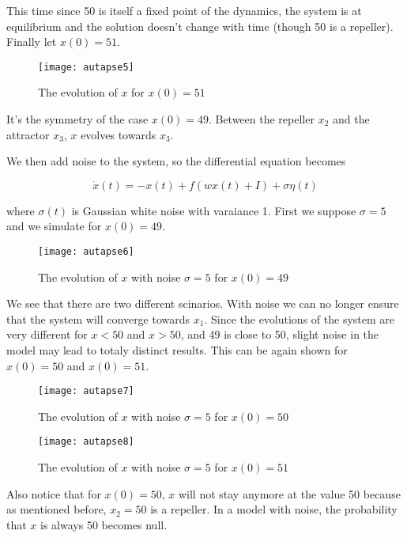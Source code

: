 \noindent
This time since 50 is itself a fixed point of the dynamics, the system 
is at equilibrium and the solution doesn't change with time (though 50
is a repeller). Finally let $x(0) = 51$.

\vspace{-1em}
\begin{figure}[H]
  \centering
  \texttt{[image: autapse5]}
  \caption{The evolution of $x$ for $x(0) = 51$}
\end{figure}

\noindent
It's the symmetry of the case $x(0) = 49$. Between the repeller $x_2$ and
the attractor $x_3$, $x$ evolves towards $x_3$.

We then add noise to the system, so the differential equation becomes

\[\dot{x}(t) = -x(t) + f(wx(t)+I) + \sigma\eta(t)\]

\noindent
where $\sigma(t)$ is Gaussian white noise with varaiance 1. First we suppose 
$\sigma = 5$ and we simulate for $x(0) = 49$.

\vspace{-1em}
\begin{figure}[H]
  \centering
  \texttt{[image: autapse6]}
  \caption{The evolution of $x$ with noise $\sigma = 5$ for $x(0) = 49$}
\end{figure}

We see that there are two different scinarios. With noise we can no longer
ensure that the system will converge towards $x_1$. Since the evolutions of
the system are very different for $x < 50$ and $x > 50$, and 49 is close
to 50, slight noise in the model may lead to totaly distinct results. This can
be again shown for $x(0) = 50$ and $x(0) = 51$.

\vspace{-1em}
\begin{figure}[H]
  \centering
  \texttt{[image: autapse7]}
  \caption{The evolution of $x$ with noise $\sigma = 5$ for $x(0) = 50$}
\end{figure}

\vspace{-1em}
\begin{figure}[H]
  \centering
  \texttt{[image: autapse8]}
  \caption{The evolution of $x$ with noise $\sigma = 5$ for $x(0) = 51$}
\end{figure}

Also notice that for $x(0) = 50$, $x$ will not stay anymore at the value 50 
because as mentioned before, $x_2 = 50$ is a repeller. In a model with noise,
the probability that $x$ is always 50 becomes null. 

